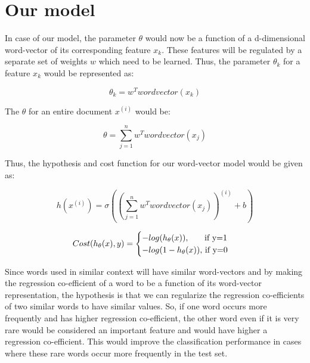 
\section{Our model}

In case of our model, the parameter $\theta$ would now be a function of a d-dimensional word-vector of its corresponding feature $x_{k}$. These features will be regulated by a separate set of weights $w$ which need to be learned. Thus, the parameter $\theta_{k}$ for a feature $x_{k}$ would be represented as:

\begin{equation}
\theta_{k} = w^{T} wordvector(x_{k})
\end{equation}

The $\theta$ for an entire document $x^{(i)}$ would be:

\begin{equation}
\theta = \sum_{j=1}^{n}{w^{T} wordvector(x_{j})}
\end{equation}

Thus, the hypothesis and cost function for our word-vector model would be given as:

\begin{equation}
h(x^{(i)}) = \sigma{((\sum_{j=1}^{n}{w^{T} wordvector(x_{j})})^{(i)}+b)}
\end{equation}

\begin{equation}\label{cost_fn_eq}
Cost(h_{\theta}(x), y) = 
\begin{cases}
-log(h_{\theta}(x)), $\qquad if y=1$
\\
-log(1-h_{\theta}(x)), $ if y=0$
\end{cases}
\end{equation}

Since words used in similar context will have similar word-vectors and by making the regression co-efficient of a word to be a function of its word-vector representation, the hypothesis is that we can regularize the regression co-efficients of two similar words to have similar values. So, if one word occurs more frequently and has higher regression co-efficient, the other word even if it is very rare would be considered an important feature and would have higher a regression co-efficient. This would improve the classification performance in cases where these rare words occur more frequently in the test set.

\vspace{5mm}

